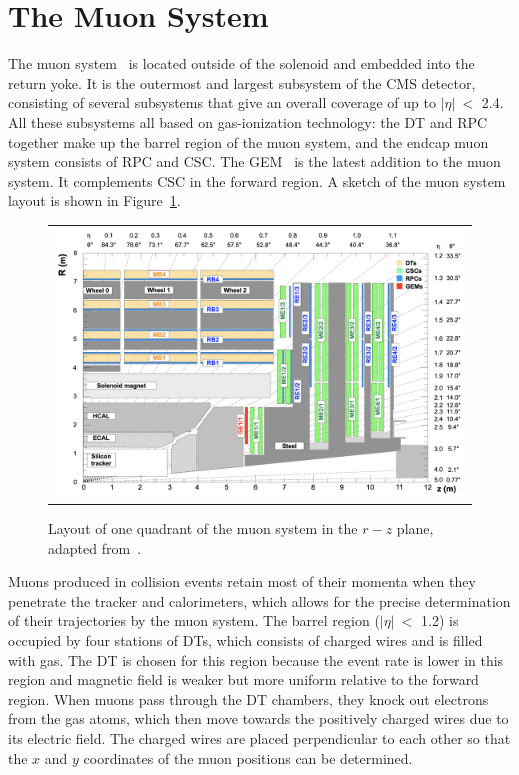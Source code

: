 \section{The Muon System}
\label{sec:MuonSys}

The muon system~\cite{CMS:1997iti} is located outside of the solenoid and embedded into the return yoke. It is the outermost and largest subsystem of the \ac{CMS} detector, consisting of several subsystems that give an overall coverage of up to $|\eta|~<$ 2.4. All these subsystems all based on gas-ionization technology: the \ac{DT} and \ac{RPC} together make up the barrel region of the muon system, and the endcap muon system consists of \ac{RPC} and  \ac{CSC}. The \ac{GEM}~\cite{Colaleo:2015vsq} is the latest addition to the muon system. It complements \ac{CSC} in the forward region. A sketch of the muon system layout is shown in Figure~\ref{fig:Muon}.

\begin{figure}[tbh!]
 \begin{center}
 \begin{tabular}{c}
 \includegraphics[width=1\textwidth]{figures/Part2/CMS/Muon}
 \end{tabular}
 \caption{Layout of one quadrant of the muon system in the $r-z$ plane, adapted from~\cite{Colaleo:2015vsq}.}
 \label{fig:Muon}
 \end{center}
\end{figure}

Muons produced in collision events retain most of their momenta when they penetrate the tracker and calorimeters, which allows for the precise determination of their trajectories by the muon system. The barrel region ($|\eta|~<$ 1.2) is occupied by four stations of \acp{DT}, which consists of charged wires and is filled with gas. The \ac{DT} is chosen for this region because the event rate is lower in this region and magnetic field is weaker but more uniform relative to the forward region. When muons pass through the \ac{DT} chambers, they knock out electrons from the gas atoms, which then move towards the positively charged wires due to its electric field. The charged wires are placed perpendicular to each other so that the $x$ and $y$ coordinates of the muon positions can be determined. 


